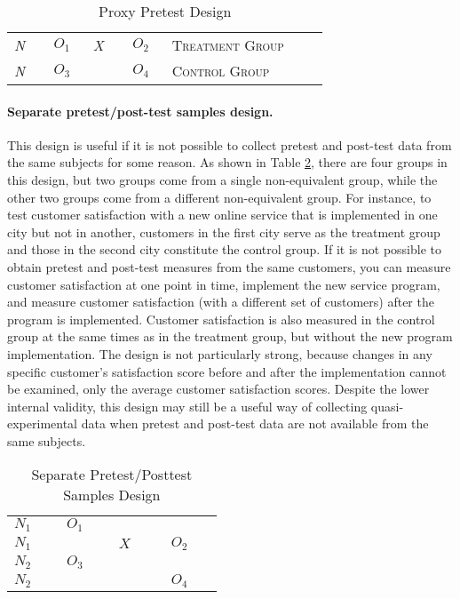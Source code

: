 \begin{table}[H]
	\centering
	\begin{tabularx}{0.85\linewidth}{p{0.10\linewidth}p{0.10\linewidth}p{0.10\linewidth}p{0.10\linewidth}p{0.40\linewidth}}
		\toprule
		\textit{N} & $ O_1 $ & \textit{X} & $ O_2 $ & \textsc{Treatment Group} \\
		\textit{N} & $ O_3 $ &            & $ O_4 $ & \textsc{Control Group} \\
		\bottomrule
	\end{tabularx}
	\caption{Proxy Pretest Design}
	\label{09:tab11}
\end{table}

\paragraph{Separate pretest/post-test samples design.} This design is useful if it is not possible to collect pretest and post-test data from the same subjects for some reason. As shown in Table \ref{09:tab12}, there are four groups in this design, but two groups come from a single non-equivalent group, while the other two groups come from a different non-equivalent group. For instance, to test customer satisfaction with a new online service that is implemented in one city but not in another, customers in the first city serve as the treatment group and those in the second city constitute the control group. If it is not possible to obtain pretest and post-test measures from the same customers, you can measure customer satisfaction at one point in time, implement the new service program, and measure customer satisfaction (with a different set of customers) after the program is implemented. Customer satisfaction is also measured in the control group at the same times as in the treatment group, but without the new program implementation. The design is not particularly strong, because changes in any specific customer's satisfaction score before and after the implementation cannot be examined, only the average customer satisfaction scores. Despite the lower internal validity, this design may still be a useful way of collecting quasi-experimental data when pretest and post-test data are not available from the same subjects.

\begin{table}[H]
	\centering
	\begin{tabularx}{0.65\linewidth}{p{0.15\linewidth}p{0.15\linewidth}p{0.15\linewidth}p{0.15\linewidth}}
		\toprule
		$ N_1 $ & $ O_1 $  &       &         \\
		$ N_1 $ &          & $ X $ & $ O_2 $ \\
		$ N_2 $ & $ O_3 $  &       &         \\
		$ N_2 $ &          &       & $ O_4 $ \\
		\bottomrule
	\end{tabularx}
	\caption{Separate Pretest/Posttest Samples Design}
	\label{09:tab12}
\end{table}

